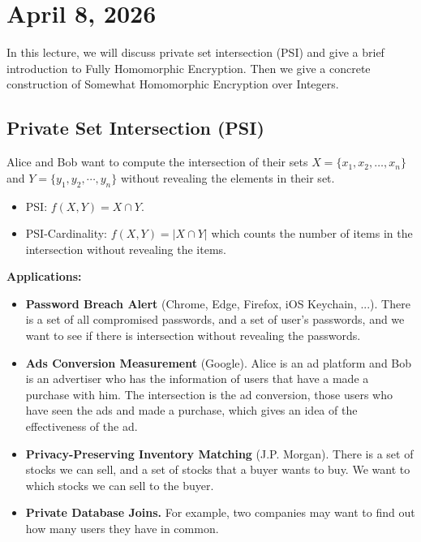 \section{April 8, 2026}
\label{20260408}

In this lecture, we will discuss private set intersection (PSI) and give a brief introduction to Fully Homomorphic Encryption. Then we give a concrete construction of Somewhat Homomorphic Encryption over Integers.

\subsection{Private Set Intersection (PSI)}

Alice and Bob want to compute the intersection of their sets $X = \{x_1, x_2, \dots, x_n\}$ and $Y = \{y_1, y_2, \cdots, y_n\}$ without revealing the elements in their set.

\begin{itemize}
    \item PSI: $f(X, Y) = X\cap Y$.
    \item PSI-Cardinality: $f(X, Y) = |X\cap Y|$ which counts the number of items in the intersection without revealing the items.
\end{itemize}

\textbf{Applications:}
\begin{itemize}
    \item \textbf{Password Breach Alert} (Chrome, Edge, Firefox, iOS Keychain, ...). There is a set of all compromised passwords, and a set of user's passwords, and we want to see if there is intersection without revealing the passwords.
    \item \textbf{Ads Conversion Measurement} (Google). Alice is an ad platform and Bob is an advertiser who has the information of users that have a made a purchase with him. The intersection is the ad conversion, those users who have seen the ads and made a purchase, which gives an idea of the effectiveness of the ad.
    \item \textbf{Privacy-Preserving Inventory Matching} (J.P. Morgan). There is a set of stocks we can sell, and a set of stocks that a buyer wants to buy. We want to which stocks we can sell to the buyer.
    \item \textbf{Private Database Joins.} For example, two companies may want to find out how many users they have in common.
\end{itemize}

